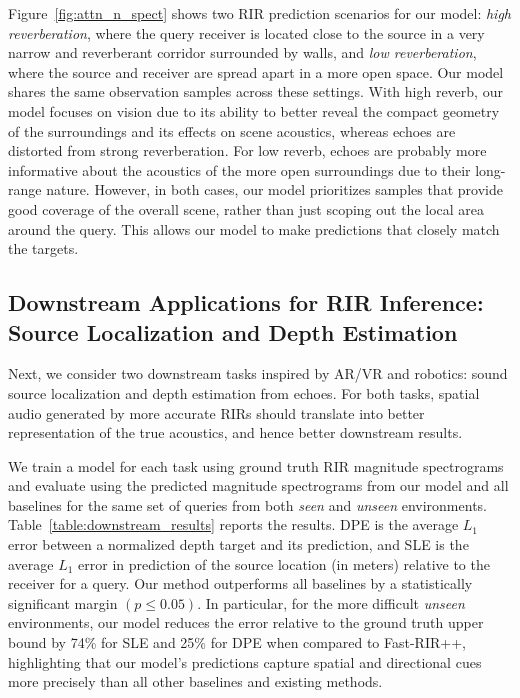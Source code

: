 Figure~\ref{fig:attn_n_spect} shows two RIR prediction scenarios for our model: \emph{high reverberation}, where the query receiver is located close to the source in a very narrow and reverberant corridor surrounded by walls, and \emph{low reverberation}, where the source and receiver are spread apart in a more open space. Our model shares the same observation samples across these settings. With high reverb, our model focuses on vision due to its ability to better reveal the compact geometry of the surroundings and its effects on scene acoustics, whereas echoes are distorted from strong reverberation. For low reverb, echoes are probably more informative about the acoustics of the more open surroundings due to their long-range nature. However, in both cases, our model prioritizes samples that provide good coverage of the overall scene, rather than just scoping out the local area around the query. This allows our model to make predictions that closely match the targets. 

\subsection{Downstream Applications for RIR Inference: Source Localization and Depth Estimation}\label{sec:eval_downstream}

Next, we consider two downstream tasks inspired by AR/VR and robotics: sound source localization and depth estimation from echoes. For both tasks, spatial audio generated by more accurate RIRs should translate into better representation of the true acoustics, and hence better downstream results. 

We train a model for each task using ground truth RIR magnitude spectrograms and evaluate using the predicted magnitude spectrograms from our model and all baselines for the same set of queries from both \emph{seen} and \emph{unseen} environments. Table~\ref{table:downstream_results} reports the results. DPE is the average $L_1$ error between a normalized depth target and its prediction, and SLE is the average $L_1$ error in prediction of the source location (in meters) relative to the receiver for a query. Our method outperforms all baselines by a statistically significant margin $(p \leq 0.05)$. In particular, for the more difficult \emph{unseen} environments, our model reduces the error relative to the ground truth upper bound by 74\% for SLE and 25\% for DPE when compared to Fast-RIR++, highlighting that our model's predictions capture spatial and directional cues more precisely than all other baselines and existing methods. 

